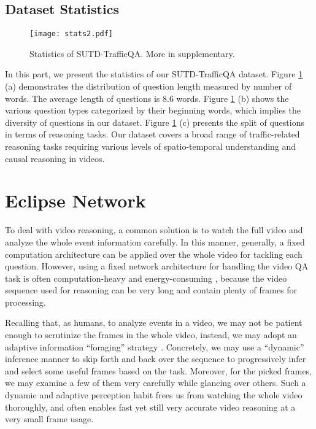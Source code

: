 \documentclass[final]{cvpr}
\begin{document}
\subsection{Dataset Statistics}

\begin{figure}[h]
\begin{center}
    \texttt{[image: stats2.pdf]}
\end{center}
\vspace{-0.4cm}
\caption{Statistics of SUTD-TrafficQA. More in supplementary.
}
\label{fig:Dataset_stats}
\vspace{-0.2cm}
\end{figure}

In this part, we present the statistics of our SUTD-TrafficQA dataset. Figure \ref{fig:Dataset_stats} (a) demonstrates the distribution of question length measured by number of words. The average length of questions is $8.6$ words. Figure \ref{fig:Dataset_stats} (b) shows the various question types categorized by their beginning words, which implies the diversity of questions in our dataset.
Figure \ref{fig:Dataset_stats} (c) presents the split of questions in terms of reasoning tasks.  Our dataset covers a broad range of traffic-related reasoning tasks requiring various levels of spatio-temporal understanding and causal reasoning in videos. 
\section{Eclipse Network}



To deal with video reasoning, a common solution is to watch the full video and analyze the whole event information carefully. In this manner, generally, a fixed computation architecture \cite{lei2018tvqa,jang2017tgif,arad2018compositional,Le_2020_CVPR} can be applied over the whole video for tackling each question. However, using a fixed network architecture for handling the video QA task is often computation-heavy and energy-consuming \cite{strubell2019energy,schwartz2019green}, because the video sequence used for reasoning can be very long and contain plenty of frames for processing.




Recalling that, as humans,
to analyze events in a video, we may not be patient enough to scrutinize the frames in the whole video,
instead, we may adopt an adaptive information ``foraging'' strategy  \cite{fitzsimmons2014skim,duggan2011skim}.
Concretely, we may 
use a ``dynamic'' inference manner 
to skip forth and back over the sequence to progressively infer and select some useful frames based on the task. Moreover, for the picked frames, we may examine a few of them very carefully while glancing over others. 
Such a dynamic and adaptive perception habit \cite{fitzsimmons2014skim,duggan2011skim} frees us from watching the whole video thoroughly, and often enables fast yet still very accurate video reasoning at a very small frame usage.
\end{document}

